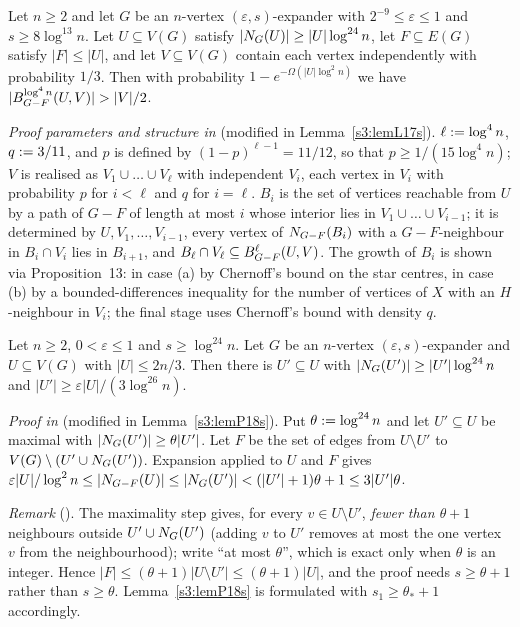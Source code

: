 \begin{citedresult}[{\cite[Lemma~17]{BM}}]\label{s1:citLem17}
Let $n\ge2$ and let $G$ be an $n$-vertex $(\varepsilon,s)$-expander with
$2^{-9}\le\varepsilon\le1$ and $s\ge8\log^{13}n$. Let $U\subseteq V(G)$ satisfy
$|N_G(U)|\ge|U|\log^{24}n$, let $F\subseteq E(G)$ satisfy $|F|\le|U|$, and let
$V\subseteq V(G)$ contain each vertex independently with probability $1/3$. Then
with probability $1-e^{-\Omega(|U|\log^2n)}$ we have
$|\Ball{\log^4n}{G-F}{U,V}|>|V|/2$.

\emph{Proof parameters and structure in \cite{BM}} (modified in
Lemma~\ref{s3:lemL17s}). $\ell\mathrel{:=}\log^4n$, $q\mathrel{:=}3/11$, and $p$ is defined
by $(1-p)^{\ell-1}=11/12$, so that $p\ge1/(15\log^4n)$; $V$ is realised as
$V_1\cup\dots\cup V_\ell$ with independent $V_i$, each vertex in $V_i$ with
probability $p$ for $i<\ell$ and $q$ for $i=\ell$. $B_i$ is the set of vertices
reachable from $U$ by a path of $G-F$ of length at most $i$ whose interior lies
in $V_1\cup\dots\cup V_{i-1}$; it is determined by $U,V_1,\dots,V_{i-1}$, every
vertex of $N_{G-F}(B_i)$ with a $G-F$-neighbour in $B_i\cap V_i$ lies in
$B_{i+1}$, and $B_\ell\cap V_\ell\subseteq B^{\ell}_{G-F}(U,V)$. The growth of
$B_i$ is shown via Proposition~13: in case (a) by Chernoff's bound on the star
centres, in case (b) by a bounded-differences inequality for the number of
vertices of $X$ with an $H$-neighbour in $V_i$; the final stage uses Chernoff's
bound with density $q$.
\end{citedresult}

\begin{citedresult}[{\cite[Proposition~18]{BM}}]\label{s1:citProp18}
Let $n\ge2$, $0<\varepsilon\le1$ and $s\ge\log^{24}n$. Let $G$ be an $n$-vertex
$(\varepsilon,s)$-expander and $U\subseteq V(G)$ with $|U|\le2n/3$. Then there is
$U'\subseteq U$ with $|N_G(U')|\ge|U'|\log^{24}n$ and
$|U'|\ge\varepsilon|U|/(3\log^{26}n)$.

\emph{Proof in \cite{BM}} (modified in Lemma~\ref{s3:lemP18s}). Put
$\theta\mathrel{:=}\log^{24}n$ and let $U'\subseteq U$ be maximal with
$|N_G(U')|\ge\theta|U'|$. Let $F$ be the set of edges from $U\setminus U'$ to
$V(G)\setminus(U'\cup N_G(U'))$. Expansion applied to $U$ and $F$ gives
$\varepsilon|U|/\log^2n\le|N_{G-F}(U)|\le|N_G(U')|<(|U'|+1)\theta+1\le
3|U'|\theta$.

\emph{Remark} (). The maximality step gives, for every $v\in U\setminus
U'$, \emph{fewer than $\theta+1$} neighbours outside $U'\cup N_G(U')$ (adding
$v$ to $U'$ removes at most the one vertex $v$ from the neighbourhood); \cite{BM}
write ``at most $\theta$'', which is exact only when $\theta$ is an integer.
Hence $|F|\le(\theta+1)|U\setminus U'|\le(\theta+1)|U|$, and the proof needs
$s\ge\theta+1$ rather than $s\ge\theta$. Lemma~\ref{s3:lemP18s} is formulated
with $s_1\ge\theta_*+1$ accordingly.
\end{citedresult}

